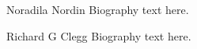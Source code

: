 \documentclass[journal]{IEEEtran}
\begin{document}
\ifCLASSOPTIONcaptionsoff
  \newpage
\fi





%
%
%




% 

\begin{IEEEbiography}{Noradila Nordin}
Biography text here.
\end{IEEEbiography}

\begin{IEEEbiography}{Richard G Clegg}
Biography text here.
\end{IEEEbiography}
\end{document}
